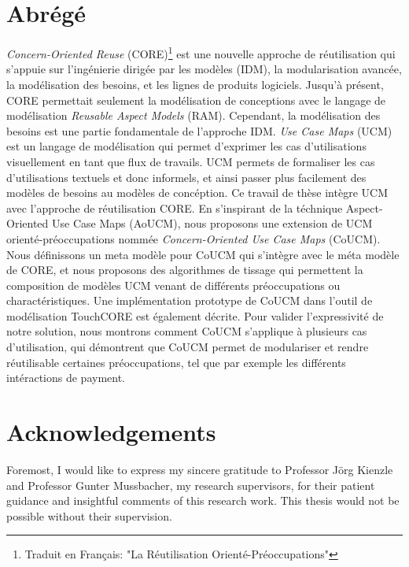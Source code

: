 \documentclass[12pt,letterpaper]{report}
\begin{document}
	\clearpage
	
	\chapter*{Abrégé}
	
	\emph{Concern-Oriented Reuse} (CORE)\footnote{Traduit en Fran{\c c}ais: "La R{\'e}utilisation Orient{\'e}-Pr{\'e}occupations"} est une nouvelle approche de r{\'e}utilisation qui s'appuie sur l'ing{\'e}nierie dirig{\'e}e par les mod{\`e}les (IDM), la modularisation avanc{\'e}e, la mod{\'e}lisation des besoins, et les lignes de produits logiciels. Jusqu'{\`a} pr{\'e}sent, CORE permettait seulement la mod{\'e}lisation de conceptions avec le langage de mod{\'e}lisation \emph{Reusable Aspect Models} (RAM). Cependant, la mod{\'e}lisation des besoins est une partie fondamentale de l'approche IDM. \emph{Use Case Maps} (UCM) est un langage de mod{\'e}lisation qui permet d'exprimer les cas d'utilisations visuellement en tant que flux de travails. UCM permets de formaliser les cas d'utilisations textuels et donc informels, et ainsi passer plus facilement des mod{\`e}les de besoins au mod{\`e}les de conc{\'e}ption. Ce travail de th{\`e}se int{\`e}gre UCM avec l'approche de r{\'e}utilisation CORE. En s'inspirant de la t{\'e}chnique Aspect-Oriented Use Case Maps (AoUCM), nous proposons une extension de UCM orient{\'e}-pr{\'e}occupations nomm{\'e}e \emph{Concern-Oriented Use Case Maps} (CoUCM). Nous d{\'e}finissons un meta mod{\`e}le pour CoUCM qui s'int{\`e}gre avec le m{\'e}ta mod{\`e}le de CORE, et nous proposons des algorithmes de tissage qui permettent la composition de mod{\`e}les UCM venant de diff{\'e}rents pr{\'e}occupations ou charact{\'e}ristiques. Une impl{\'e}mentation prototype de CoUCM dans l'outil de mod{\'e}lisation TouchCORE est {\'e}galement d{\'e}crite. Pour valider l'expressivit{\'e} de notre solution, nous montrons comment CoUCM s'applique {\`a} plusieurs cas d'utilisation, qui d{\'e}montrent que CoUCM permet de modulariser et rendre r{\'e}utilisable certaines pr{\'e}occupations, tel que par exemple les diff{\'e}rents int{\'e}ractions de payment.	
	
	\clearpage
	
	\chapter*{Acknowledgements}
	
	Foremost, I would like to express my sincere gratitude to Professor Jörg Kienzle and Professor Gunter Mussbacher, my research supervisors, for their patient guidance and insightful comments of this research work. This thesis would not be possible without their supervision.
	
\end{document}
